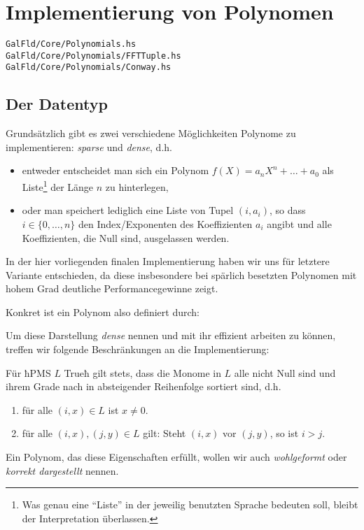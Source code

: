 \section{Implementierung von Polynomen}
\label{sec:polynomials}
\texttt{GalFld/Core/Polynomials.hs}\\
\texttt{GalFld/Core/Polynomials/FFTTuple.hs}\\
\texttt{GalFld/Core/Polynomials/Conway.hs}\\

\subsection{Der Datentyp}

Grundsätzlich gibt es zwei verschiedene Möglichkeiten Polynome zu
implementieren: \emph{sparse} und \emph{dense}, d.h. 
\begin{itemize}
  \item entweder entscheidet man
    sich ein Polynom $f(X) = a_nX^n + \ldots + a_0$ als Liste\footnote{Was genau 
    eine ``Liste'' in der jeweilig benutzten Sprache bedeuten soll, bleibt der
    Interpretation überlassen.} der Länge $n$ zu hinterlegen,
  \item oder man speichert lediglich eine Liste von Tupel $(i,a_i)$, so dass
    $i \in \{0,\ldots,n\}$ den Index/Exponenten des Koeffizienten $a_i$ angibt
    und alle Koeffizienten, die Null sind, ausgelassen werden.
\end{itemize}
In der hier vorliegenden finalen Implementierung haben wir uns für letztere
Variante entschieden, da diese insbesondere bei spärlich besetzten Polynomen
mit hohem Grad deutliche Performancegewinne zeigt.

Konkret ist ein Polynom also definiert durch:

Um diese Darstellung \emph{dense} nennen und mit ihr effizient arbeiten zu 
können, treffen wir folgende Beschränkungen an die Implementierung:
\begin{invariante}
  \label{inv:poly}
  Für ħPMS $L$ Trueħ gilt stets, dass die Monome in $L$ alle nicht Null 
  sind und ihrem Grade nach in
  absteigender Reihenfolge sortiert sind, d.h.
  \begin{enumerate}
    \item für alle $(i,x) \in L$ ist $x \neq 0$.
    \item für alle $(i,x), (j,y) \in L$ gilt: Steht $(i,x)$ vor $(j,y)$, so ist
      $i > j$.
  \end{enumerate}
  Ein Polynom, das diese Eigenschaften erfüllt, wollen wir auch 
  \emph{wohlgeformt} oder \emph{korrekt dargestellt} nennen.
\end{invariante}

